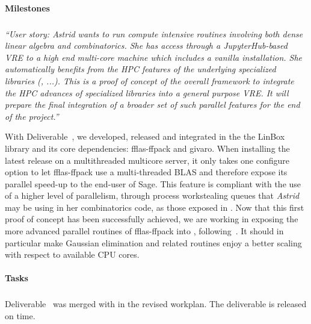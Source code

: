 \paragraph{Milestones}


\subparagraph{}

\emph{“User story: Astrid wants to run compute intensive routines
    involving both dense linear algebra and combinatorics. She has
    access through a JupyterHub-based VRE to a high end multi-core
    machine which includes a vanilla \Sage installation. She
    automatically benefits from the HPC features of the underlying
    specialized libraries (\Linbox, ...). This is a proof of concept
    of the overall framework to integrate the HPC advances of
    specialized libraries into a general purpose VRE.
    It will prepare the final integration of a broader set of such
    parallel features for the end of the project.”}

With Deliverable~, we developed, released and integrated in the
\Sage the LinBox library and its core dependencies: fflas-ffpack and givaro.
When installing the latest \Sage release on a multithreaded multicore server, it
only takes one configure option to let fflas-ffpack use a multi-threaded BLAS
and therefore expose its parallel speed-up to the end-user of Sage. This feature
is compliant with the use of a higher level of parallelism, through process
workstealing queues that \textit{Astrid} may be using in her combinatorics code, as those
exposed in . Now that this first proof of concept has been
successfully achieved, we are working in exposing the more advanced parallel
routines of fflas-ffpack into \Sage, following~. It
should in particular make Gaussian elimination and related routines enjoy a
better scaling with respect to available CPU cores.

\paragraph{Tasks}

\medskip
\subparagraph{}
Deliverable~ was merged with
 in the revised workplan. The deliverable
 is released on time.

